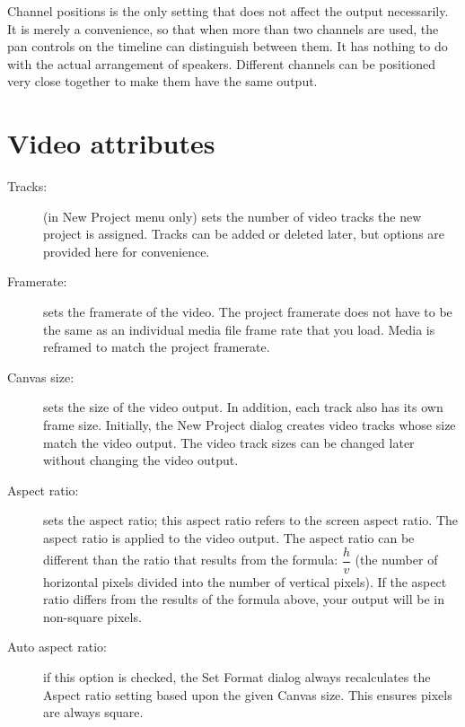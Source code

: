 \begin{description}
  Channel positions is the only setting that does not affect the
output necessarily.  It is merely a convenience, so that when more
than two channels are used, the pan controls on the timeline can
distinguish between them.  It has nothing to do with the actual
arrangement of speakers.  Different channels can be positioned very
close together to make them have the same output.
\end{description}


\section{Video attributes}%
\label{sec:video_attributes}

\begin{description}
\item[Tracks:] (in New Project menu only) sets the number of video
tracks the new project is assigned.  Tracks can be added or deleted
later, but options are provided here for convenience.

\item[Framerate:] sets the framerate of the video.  The project
framerate does not have to be the same as an individual media file
frame rate that you load.  Media is reframed to match the project
framerate.

\item[Canvas size:] sets the size of the video output.  In addition,
each track also has its own frame size.  Initially, the New Project
dialog creates video tracks whose size match the video output.  The
video track sizes can be changed later without changing the video
output.

\item[Aspect ratio:] sets the aspect ratio; this aspect ratio refers
to the screen aspect ratio.  The aspect ratio is applied to the
video output.  The aspect ratio can be different than the ratio that
results from the formula: $\dfrac{h}{v}$ (the number of horizontal
pixels divided into the number of vertical pixels).  If the aspect
ratio differs from the results of the formula above, your output
will be in non-square pixels.

\item[Auto aspect ratio:] if this option is checked, the Set Format
dialog always recalculates the Aspect ratio setting based upon the
given Canvas size. This ensures pixels are always square.


\end{description}
